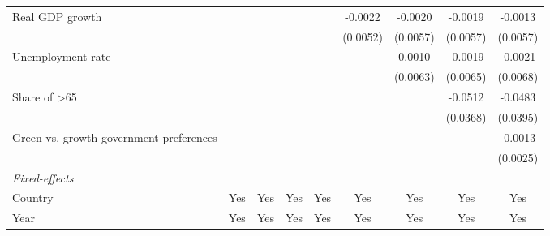 \begin{table}[htbp]
\begin{tabular}{lcccccccc}
      Real GDP growth                                                                    &                       &          &                &                & -0.0022        & -0.0020        & -0.0019        & -0.0013\\   
                                                                                         &                       &          &                &                & (0.0052)       & (0.0057)       & (0.0057)       & (0.0057)\\   
      Unemployment rate                                                                  &                       &          &                &                &                & 0.0010         & -0.0019        & -0.0021\\   
                                                                                         &                       &          &                &                &                & (0.0063)       & (0.0065)       & (0.0068)\\   
      Share of >65                                                                       &                       &          &                &                &                &                & -0.0512        & -0.0483\\   
                                                                                         &                       &          &                &                &                &                & (0.0368)       & (0.0395)\\   
      Green vs. growth government preferences                                            &                       &          &                &                &                &                &                & -0.0013\\   
                                                                                         &                       &          &                &                &                &                &                & (0.0025)\\   
      \midrule
      \emph{Fixed-effects}\\
      Country                                                                            & Yes                   & Yes      & Yes            & Yes            & Yes            & Yes            & Yes            & Yes\\  
      Year                                                                               & Yes                   & Yes      & Yes            & Yes            & Yes            & Yes            & Yes            & Yes\\  

\end{tabular}
\end{table}
